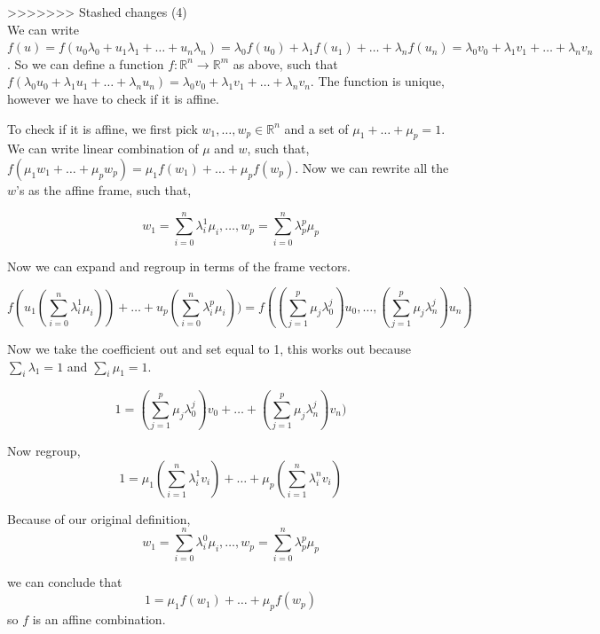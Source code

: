 \documentclass[12pt]{article}
\begin{document}
\medskip
>>>>>>> Stashed changes
(4) \\
We can write $f(u) = f(u_0\lambda_0 + u_1\lambda_1 + \ldots + u_n\lambda_n) = \lambda_0f(u_0) + \lambda_1f(u_1) + \ldots + \lambda_nf(u_n) = \lambda_0v_0 + \lambda_1v_1 + \ldots + \lambda_nv_n$. So we can define a function $f: \mathbb{R} ^n \rightarrow \mathbb{R} ^m$ as above, such that $f(\lambda_0u_0 + \lambda_1u_1 + \ldots + \lambda_nu_n) = \lambda_0v_0 + \lambda_1v_1 + \ldots + \lambda_nv_n$. The function is unique, however we have to check if it is affine. 

To check if it is affine, we first pick $w_1, \ldots, w_p \in \mathbb{R}^n$ and a set of $\mu_1 + \ldots + \mu_p = 1$. We can write linear combination of $\mu$ and $w$, such that, 
$f(\mu_1 w_1 + \ldots + \mu_p w_p) = \mu_1 f(w_1) + \ldots + \mu_p f(w_p)$. Now we can rewrite all the $w$'s as the affine frame, such that, 

$$w_1 = \sum_{i=0}^{n} \lambda_i^1 \mu_i, \ldots, w_p = \sum_{i=0}^{n} \lambda_p^p \mu_p$$

Now we can expand and regroup in terms of the frame vectors. 

$$ f(u_1(\sum_{i=0}^{n} \lambda_{i}^{1} \mu_i)) + \ldots + u_p(\sum_{i=0}^{n} \lambda_{i}^{p} \mu_i)) = f((\sum_{j=1}^{p} \mu_j \lambda_{0}^{j}) u_0, \ldots, (\sum_{j=1}^{p} \mu_j \lambda_{n}^{j}) u_n) $$ 

Now we take the coefficient out and set equal to 1, this works out because $\sum_{i} \lambda_1 = 1$ and  $\sum_{i} \mu_1 = 1$. 

$$1 = (\sum_{j=1}^{p} \mu_j \lambda_{0}^{j}) v_0 + \ldots + (\sum_{j=1}^{p} \mu_j \lambda_{n}^{j}) v_n) $$

Now regroup, 
$$1 = \mu_1(\sum_{i=1}^{n} \lambda_{i}^{1} v_i) + \ldots + \mu_p(\sum_{i=1}^{n} \lambda_{i}^{n} v_i) $$ 

Because of our original definition, $$w_1 = \sum_{i=0}^{n} \lambda_i^0 \mu_i, \ldots, w_p = \sum_{i=0}^{n} \lambda_p^p \mu_p$$

we can conclude that
$$1 = \mu_1 f(w_1) + \ldots + \mu_p f(w_p)$$
so $f$ is an affine combination.  
 
 
\end{document}
